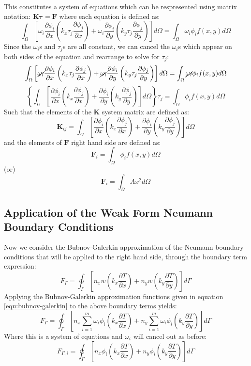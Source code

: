 \documentclass[letterpaper,10pt]{article}
\begin{document}
This constitutes a system of equations which can be respresented using matrix notation: $\mathbf{K}\mathbf{\tau}=\mathbf{F}$ where each equation is defined as:
\[
\int_\Omega \left[ \omega_i\frac{\partial \phi_i}{\partial x}\left(k_x\tau_j\frac{\partial \phi_j}{\partial x}\right) +  \omega_i\frac{\partial \phi_i}{\partial y}\left(k_y\tau_j\frac{\partial \phi_j}{\partial y}\right) \right]d\Omega = \int_\Omega \omega_i\phi_if(x,y)d\Omega
\]
Since the $\omega_i$s and $\tau_j$s are all constant, we can cancel the $\omega_i$s which appear on both sides of the equation and rearrange to solve for $\tau_j$:
\[
\int_\Omega \left[ \cancel{\omega_i}\frac{\partial \phi_i}{\partial x}\left(k_x\tau_j\frac{\partial \phi_j}{\partial x}\right) +  \cancel{\omega_i}\frac{\partial \phi_i}{\partial y}\left(k_y\tau_j\frac{\partial \phi_j}{\partial y}\right) \right]d\Omega = \int_\Omega \cancel{\omega_i}\phi_if(x,y)d\Omega
\]
\[
\left\{\int_\Omega \left[ \frac{\partial \phi_i}{\partial x}\left(k_x\frac{\partial \phi_j}{\partial x}\right) + \frac{\partial \phi_i}{\partial y}\left(k_y\frac{\partial \phi_j}{\partial y}\right) \right]d\Omega\right\}\tau_j = \int_\Omega \phi_if(x,y)d\Omega
\]
Such that the elements of the $\mathbf{K}$ system matrix are defined as:
\begin{equation}
\label{equ:Kij}
\boxed{\mathbf{K}_{ij} = \int_\Omega \left[ \frac{\partial \phi_i}{\partial x}\left(k_x\frac{\partial \phi_j}{\partial x}\right) + \frac{\partial \phi_i}{\partial y}\left(k_y\frac{\partial \phi_j}{\partial y}\right) \right]d\Omega}
\end{equation}
and the elements of $\mathbf{F}$ right hand side are defined as:
\begin{equation}
\label{equ:Fi}
\boxed{\mathbf{F}_i = \int_\Omega \phi_if(x,y)d\Omega}
\end{equation}
(or)
\[\mathbf{F}_i = \int_\Omega Ax^2d\Omega\]

\subsection{Application of the Weak Form Neumann Boundary Conditions}
Now we consider the Bubnov-Galerkin approximation of the Neumann boundary conditions that will be applied to the right hand side, through the boundary term expression:
\[
F_\Gamma = \oint_\Gamma \left[n_xw\left(k_x\frac{\partial T}{\partial x}\right) + n_yw\left(k_y\frac{\partial T}{\partial y}\right)\right]d\Gamma
\]
Applying the Bubnov-Galerkin approximation functions given in equation \ref{equ:bubnov-galerkin} to the above boundary terms yields:
\[
F_\Gamma = \oint_\Gamma \left[n_x\displaystyle\sum\limits_{i=1}^m\omega_i\phi_i\left(k_x\frac{\partial T}{\partial x}\right) + n_y\displaystyle\sum\limits_{i=1}^m\omega_i\phi_i\left(k_y\frac{\partial T}{\partial y}\right)\right]d\Gamma
\]
Where this is a system of equations and $\omega_i$ will cancel out as before:
\[
F_{\Gamma,i} = \oint_\Gamma \left[n_x\phi_i\left(k_x\frac{\partial T}{\partial x}\right) + n_y\phi_i\left(k_y\frac{\partial T}{\partial y}\right)\right]d\Gamma
\]
\end{document}
